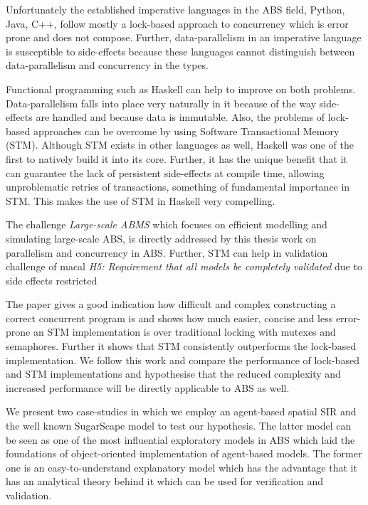 Unfortunately the established imperative languages in the ABS field, Python, Java, C++, follow mostly a lock-based approach to concurrency which is error prone and does not compose. Further, data-parallelism in an imperative language is susceptible to side-effects because these languages cannot distinguish between data-parallelism and concurrency in the types. 

Functional programming such as Haskell \citep{hudak_history_2007} can help to improve on both problems. Data-parallelism falls into place very naturally in it because of the way side-effects are handled and because data is immutable. Also, the problems of lock-based approaches can be overcome by using Software Transactional Memory (STM). Although STM exists in other languages as well, Haskell was one of the first to natively build it into its core. Further, it has the unique benefit that it can guarantee the lack of persistent side-effects at compile time, allowing unproblematic retries of transactions, something of fundamental importance in STM. This makes the use of STM in Haskell very compelling.

The challenge \textit{Large-scale ABMS} which focuses on efficient modelling and simulating large-scale ABS, is directly addressed by this thesis work on parallelism and concurrency in ABS. Further, STM can help in validation challenge of macal \emph{H5: Requirement that all models be completely validated} due to side effects restricted

The paper \cite{discolo_lock_2006} gives a good indication how difficult and complex constructing a correct concurrent program is and shows how much easier, concise and less error-prone an STM implementation is over traditional locking with mutexes and semaphores. Further it shows that STM consistently outperforms the lock-based implementation. We follow this work and compare the performance of lock-based and STM implementations and hypothesise that the reduced complexity and increased performance will be directly applicable to ABS as well.

We present two case-studies in which we employ an agent-based spatial SIR \citep{macal_agent-based_2010, thaler_pure_2019} and the well known SugarScape \citep{epstein_growing_1996} model to test our hypothesis. The latter model can be seen as one of the most influential exploratory models in ABS which laid the foundations of object-oriented implementation of agent-based models. The former one is an easy-to-understand explanatory model which has the advantage that it has an analytical theory behind it which can be used for verification and validation. 

